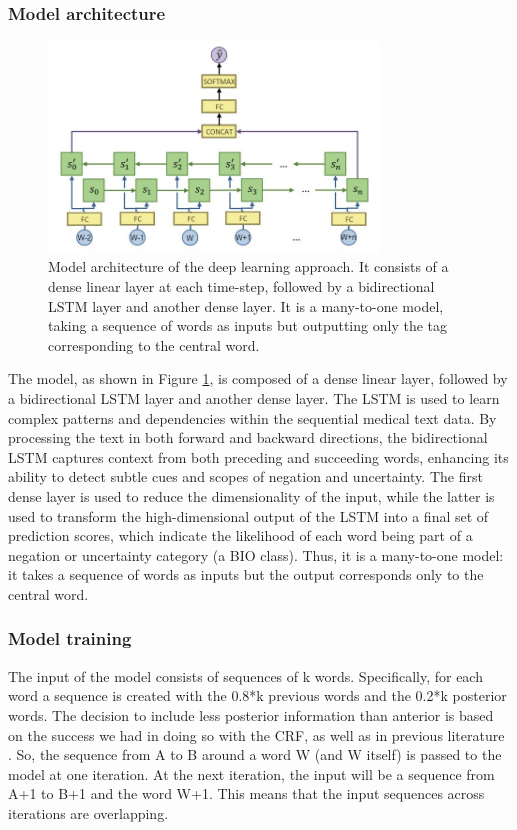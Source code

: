 \documentclass{article}
\begin{document}
\subsubsection*{Model architecture}
\begin{figure}[!t]
	\centering
	\includegraphics[height=5.6cm]{images/model.jpg}
	\captionsetup{width=0.9\textwidth}
	\caption{Model architecture of the deep learning approach. It consists of a dense linear layer at each time-step,
	followed by a bidirectional LSTM layer and another dense layer. It is a many-to-one model, taking a sequence of words as
	inputs but outputting only the tag corresponding to the central word.}
	\label{fig:model}
\end{figure}
The model, as shown in Figure \ref{fig:model}, is composed of a dense linear layer, followed by a bidirectional LSTM 
layer and another dense layer.
The LSTM is used to learn complex patterns and dependencies within the sequential medical text data. By processing
the text in both forward and backward directions, the bidirectional LSTM captures context from both preceding and 
succeeding words, enhancing its ability to detect subtle cues and scopes of negation and uncertainty. The first
dense layer is used to reduce the dimensionality of the input, while the latter is used to transform the
high-dimensional output of the LSTM into a final set of prediction scores, which indicate the likelihood of each
word being part of a negation or uncertainty category (a BIO class). Thus, it is a many-to-one model: it takes a
sequence of words as inputs but the output corresponds only to the central word.

\subsubsection*{Model training}
The input of the model consists of sequences of k words. Specifically, for each word a sequence is created with
the 0.8*k previous words and the 0.2*k posterior words. The decision to include less posterior information than
anterior is based on the success we had in doing so with the CRF, as well as in previous literature \cite{lstm1}
\cite{lstm2}. So, the sequence from A to B around a word W (and W itself) is passed to the model at one iteration.
At the next iteration, the input will be a sequence from A+1 to B+1 and the word W+1. This means that the input
sequences across iterations are overlapping.
\end{document}
